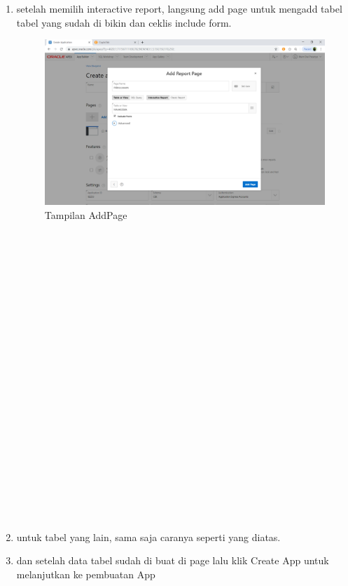 \documentclass{article}
\begin{document}
\begin{enumerate}
\\
\\
\\
\\
\\
\\
\\
\\
\\
\\
	\item setelah memilih interactive report, langsung add page untuk mengadd tabel tabel yang sudah di bikin dan ceklis include form.
	\begin{figure}[h]
	\centering
		\includegraphics[scale=0.5]{gambar/13.PNG}
		\caption{Tampilan AddPage}
\end{figure}
 \\
\\
\\
\\
\\
\\
\\
\\
\\
\\
\\
\\
\\
\\
\\
\\
\\
\\
\\
\\
\\
	\item untuk tabel yang lain, sama saja caranya seperti yang diatas.
	\item dan setelah data tabel sudah di buat di page lalu klik Create App untuk melanjutkan ke pembuatan App

\end{enumerate}
\end{document}
